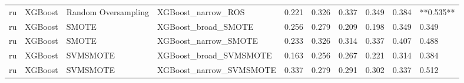 \begin{tabular}{llllllllll}
      ru &                      XGBoost & Random Oversampling &                           XGBoost\_narrow\_ROS &     0.221 &                     0.326 &                 0.337 &                  0.349 &                                   0.384 & **0.535** \\
      ru &                      XGBoost &               SMOTE &                          XGBoost\_broad\_SMOTE &     0.256 &                     0.279 &                 0.209 &                  0.198 &                                   0.349 &     0.349 \\
      ru &                      XGBoost &               SMOTE &                         XGBoost\_narrow\_SMOTE &     0.233 &                     0.326 &                 0.314 &                  0.337 &                                   0.407 &     0.488 \\
      ru &                      XGBoost &            SVMSMOTE &                       XGBoost\_broad\_SVMSMOTE &     0.163 &                     0.256 &                 0.267 &                  0.221 &                                   0.314 &     0.384 \\
      ru &                      XGBoost &            SVMSMOTE &                      XGBoost\_narrow\_SVMSMOTE &     0.337 &                     0.279 &                 0.291 &                  0.302 &                                   0.337 &     0.512 \\
\bottomrule
\end{tabular}
